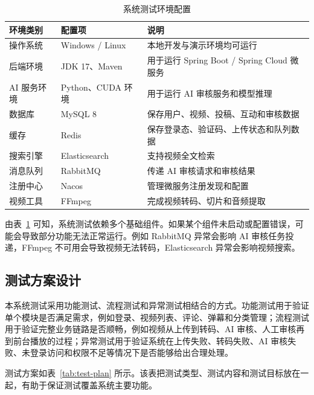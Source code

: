 \begin{table}[htbp]
  \centering
  \caption{系统测试环境配置}
  \label{tab:test-env-config}
  \begin{tabular}{p{}p{}p{}}
    \hline
    \textbf{环境类别} & \textbf{配置项} & \textbf{说明} \\
    \hline
    操作系统 & Windows / Linux & 本地开发与演示环境均可运行 \\
    后端环境 & JDK 17、Maven & 用于运行 Spring Boot / Spring Cloud 微服务 \\
    AI 服务环境 & Python、CUDA 环境 & 用于运行 AI 审核服务和模型推理 \\
    数据库 & MySQL 8 & 保存用户、视频、投稿、互动和审核数据 \\
    缓存 & Redis & 保存登录态、验证码、上传状态和队列数据 \\
    搜索引擎 & Elasticsearch & 支持视频全文检索 \\
    消息队列 & RabbitMQ & 传递 AI 审核请求和审核结果 \\
    注册中心 & Nacos & 管理微服务注册发现和配置 \\
    视频工具 & FFmpeg & 完成视频转码、切片和音频提取 \\
    \hline
  \end{tabular}
\end{table}

由表~\ref{tab:test-env-config} 可知，系统测试依赖多个基础组件。如果某个组件未启动或配置错误，可能会导致部分功能无法正常运行。例如 RabbitMQ 异常会影响 AI 审核任务投递，FFmpeg 不可用会导致视频无法转码，Elasticsearch 异常会影响视频搜索。

\subsection{测试方案设计}
\label{subsec:test-plan-design}

本系统测试采用功能测试、流程测试和异常测试相结合的方式。功能测试用于验证单个模块是否满足需求，例如登录、视频列表、评论、弹幕和分类管理；流程测试用于验证完整业务链路是否顺畅，例如视频从上传到转码、AI 审核、人工审核再到前台播放的过程；异常测试用于验证系统在上传失败、转码失败、AI 审核失败、未登录访问和权限不足等情况下是否能够给出合理处理。

测试方案如表~\ref{tab:test-plan} 所示。该表把测试类型、测试内容和测试目标放在一起，有助于保证测试覆盖系统主要功能。


